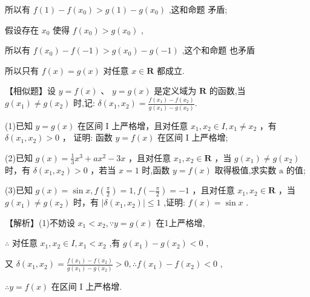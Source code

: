 \documentclass[10pt]{article}
\newcommand*\circled[1]{\tikz[baseline=(char.base)]{\node[shape=circle,draw,inner sep=1.5pt] (char) {\small #1};}}
\begin{document}
所以有 \(f\left( 1\right)  - f\left( {x}_{0}\right)  > g\left( 1\right)  - g\left( {x}_{0}\right)\) ,这和命题 \circled{1} 矛盾;

假设存在 \({x}_{0}\) 使得 \(f\left( {x}_{0}\right)  > g\left( {x}_{0}\right)\) ,

所以有 \(f\left( {x}_{0}\right)  - f\left( {-1}\right)  > g\left( {x}_{0}\right)  - g\left( {-1}\right)\) ,这个和命题 \circled{1} 也矛盾

所以只有 \(f\left( x\right)  = g\left( x\right)\) 对任意 \(x \in  \mathbf{R}\) 都成立.

【相似题】设 \(y = f\left( x\right) \text{ 、 }y = g\left( x\right)\) 是定义域为 \(\mathbf{R}\) 的函数,当 \(g\left( {x}_{1}\right)  \neq  g\left( {x}_{2}\right)\) 时,记: \(\delta \left( {{x}_{1},{x}_{2}}\right)  = \frac{f\left( {x}_{1}\right)  - f\left( {x}_{2}\right) }{g\left( {x}_{1}\right)  - g\left( {x}_{2}\right) }.\)

(1)已知 \(y = g\left( x\right)\) 在区间 \(\mathrm{I}\) 上严格增，且对任意 \({x}_{1},{x}_{2} \in  I,{x}_{1} \neq  {x}_{2}\) ，有 \(\delta \left( {{x}_{1},{x}_{2}}\right)  > 0\) ， 证明: 函数 \(y = f\left( x\right)\) 在区间 \(\mathrm{I}\) 上严格增;

(2)已知 \(g\left( x\right)  = \frac{1}{3}{x}^{3} + a{x}^{2} - {3x}\) ，且对任意 \({x}_{1},{x}_{2} \in  \mathbf{R}\) ，当 \(g\left( {x}_{1}\right)  \neq  g\left( {x}_{2}\right)\) 时，有 \(\delta \left( {{x}_{1},{x}_{2}}\right)  > 0\) ，若当 \(x = 1\) 时,函数 \(y = f\left( x\right)\) 取得极值,求实数 \(\mathrm{a}\) 的值;

(3)已知 \(g\left( x\right)  = \sin x,f\left( \frac{\pi }{2}\right)  = 1,f\left( {-\frac{\pi }{2}}\right)  =  - 1\) ，且对任意 \({x}_{1},{x}_{2} \in  \mathbf{R}\) ，当 \(g\left( {x}_{1}\right)  \neq  g\left( {x}_{2}\right)\) 时，有 \(\left| {\delta \left( {{x}_{1},{x}_{2}}\right) }\right|  \leq  1\) ,证明: \(f\left( x\right)  = \sin x\) .

【解析】(1)不妨设 \({x}_{1} < {x}_{2},\because y = g\left( x\right)\) 在1上严格增,

\(\therefore\) 对任意 \({x}_{1},{x}_{2} \in  I,{x}_{1} < {x}_{2}\) ,有 \(g\left( {x}_{1}\right)  - g\left( {x}_{2}\right)  < 0\) ,

又 \(\delta \left( {{x}_{1},{x}_{2}}\right)  = \frac{f\left( {x}_{1}\right)  - f\left( {x}_{2}\right) }{g\left( {x}_{1}\right)  - g\left( {x}_{2}\right) } > 0,\therefore f\left( {x}_{1}\right)  - f\left( {x}_{2}\right)  < 0\) ,

\(\therefore y = f\left( x\right)\) 在区间 \(\mathrm{I}\) 上严格增.
\end{document}
